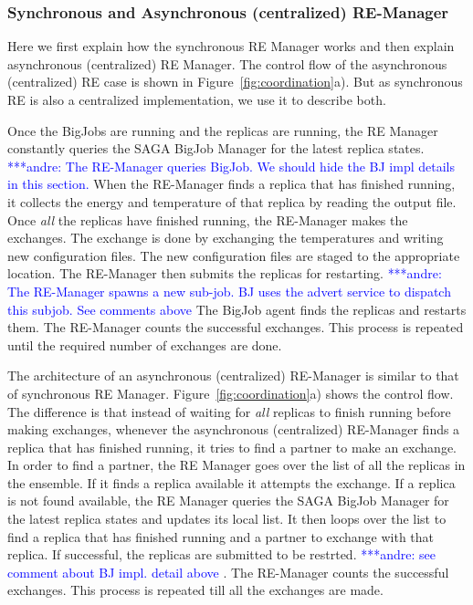 \documentclass{rspublic}
\newcommand{\jhanote}[1]{ {\textcolor{red} { ***shantenu: #1 }}}
\newcommand{\alnote}[1]{ {\textcolor{blue} { ***andre: #1 }}}
\newcommand{\alnote}[1]{}
\newcommand{\jhanote}[1]{}
\begin{document}
\subsubsection{Synchronous and Asynchronous (centralized) RE-Manager}

Here we first explain how the synchronous RE Manager works and then explain asynchronous (centralized) RE Manager. The control flow of the asynchronous (centralized) RE case is shown in
Figure~\ref{fig:coordination}a). But as synchronous RE is also a centralized implementation, we use it to describe both. %

Once the BigJobs are running and the replicas are running, the RE Manager constantly queries the SAGA BigJob Manager for the latest replica states. \alnote{The RE-Manager queries BigJob. We should hide
  the BJ impl details in this section.}  When the RE-Manager finds a
replica that has finished running, it collects the energy and
temperature of that replica by reading the output file. Once
\emph{all} the replicas have finished running, the RE-Manager makes
the exchanges. The exchange is done by exchanging the temperatures and
writing new configuration files. The new configuration files are staged to the appropriate location. The RE-Manager then submits the replicas for restarting.  \alnote{The RE-Manager spawns a new sub-job. BJ uses the
  advert service to dispatch this subjob. See comments above} The
BigJob agent finds the replicas and restarts them. The RE-Manager
counts the successful exchanges. This process is repeated until the
required number of exchanges are done.

The architecture of an asynchronous (centralized) RE-Manager is similar to that of synchronous RE Manager. 
Figure~\ref{fig:coordination}a) shows the control flow. The difference is that instead of waiting 
for \emph{all} replicas to finish running before making exchanges, whenever the 
asynchronous (centralized) RE-Manager finds a replica that 
has finished running, it tries to find a partner to make an exchange. In order to find a partner, the RE Manager goes over the list of all the replicas in the ensemble. If it finds a replica available it attempts the exchange. If a replica is not found available, the RE Manager queries the SAGA BigJob Manager for the latest replica states and updates its local list. It then loops over the list to find a replica that has finished running and a partner to exchange with that replica.
If successful, the replicas are submitted to be restrted. \alnote{see comment about BJ impl. detail above}. 
The RE-Manager counts the successful 
exchanges. This process is repeated till all the exchanges are made. 
\end{document}
